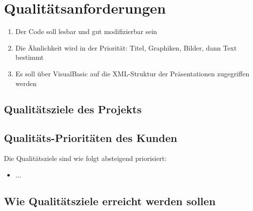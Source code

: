 \section{Qualitätsanforderungen}

\begin{enumerate}
    \item Der Code soll lesbar und gut modifizierbar sein
    \item Die Ähnlichkeit wird in der Priorität: Titel, Graphiken, Bilder, dann Text bestimmt
    \item Es soll über VisualBasic auf die XML-Struktur der Präsentationen zugegriffen werden
\end{enumerate}

\subsection{Qualitätsziele des Projekts}



\subsection{Qualitäts-Prioritäten des Kunden}


Die Qualitätsziele sind wie folgt absteigend priorisiert:
\begin{itemize}
    \item ...
\end{itemize}

\subsection{Wie Qualitätsziele erreicht werden sollen}
